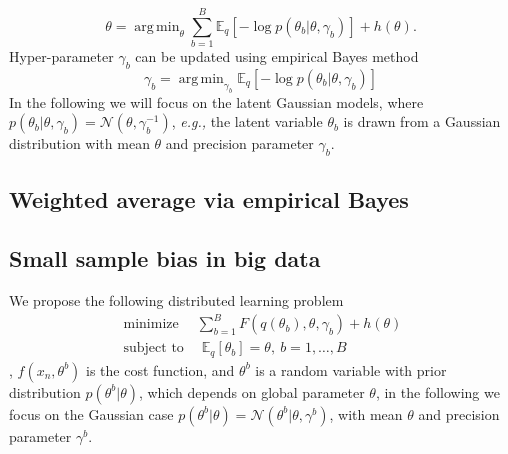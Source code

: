 \documentclass{article}
\DeclareMathOperator*{\argmin}{arg\,min}
\DeclareMathOperator*{\minimize}{minimize}
\DeclareMathOperator*{\st}{subject~to}
\newcommand{\eg}[0]{\emph{e.g., }}
\newcommand{\1}[0]{\ensuremath{\boldsymbol{1}}\xspace}
\begin{document}
\begin{equation*}
\theta = \argmin_{\theta}\sum_{b=1}^B\mathbb{E}_q[-\log p(\theta_b|\theta, \gamma_b)] + h(\theta).
\end{equation*}
Hyper-parameter $\gamma_b$ can be updated using empirical Bayes method
\begin{equation*}
\gamma_b = \argmin_{\gamma_b} \mathbb{E}_q[-\log p(\theta_b|\theta, \gamma_b)]
\end{equation*}
In the following we will focus on the latent Gaussian models, where $p(\theta_b|\theta, \gamma_b) = \mathcal{N}(\theta, \gamma_b^{-1})$, \eg the latent variable $\theta_b$ is drawn from a Gaussian distribution with mean $\theta$ and precision parameter $\gamma_b$.


\subsection{Weighted average via empirical Bayes}

\subsection{Small sample 	bias in big data}


We propose the following distributed learning problem
\begin{equation}\label{basic_model}
\begin{gathered}
\minimize \quad\sum_{b=1}^B F(q(\theta_b), \theta, \gamma_b) + h(\theta)\\
\st \quad \mathbb{E}_q[\theta_b] = \theta, ~ b = 1, \ldots, B
\end{gathered}
\end{equation}
,  $f(x_n, \theta^b)$ is the cost function, and $\theta^b$ is a random variable with prior distribution $p(\theta^b|\theta)$, which depends on global parameter $\theta$, in the following we focus on the Gaussian case $p(\theta^b|\theta) = \mathcal{N}(\theta^b | \theta, \gamma^b)$, with mean $\theta$ and precision parameter $\gamma^b$.
\end{document}
